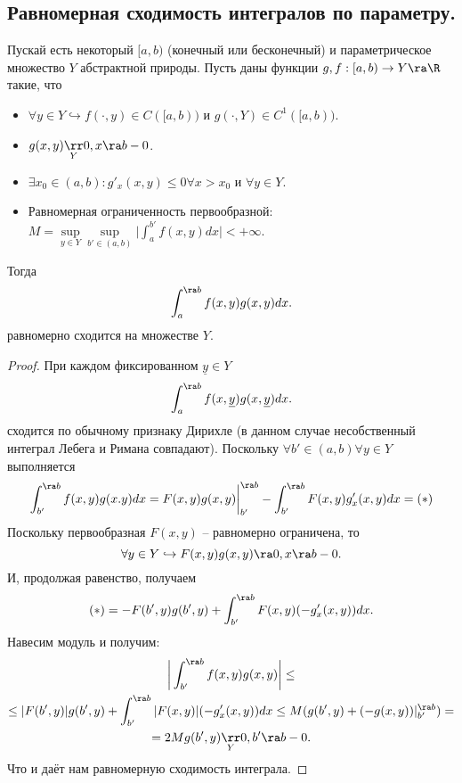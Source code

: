 \subsection{Равномерная сходимость интегралов по параметру.}
\begin{theorem}
    Пускай есть некоторый $[a, b)$ (конечный или бесконечный) и параметрическое множество $Y$ абстрактной природы.
    Пусть даны функции $g, f: [a, b) \to Y \ra \R$ такие, что
    \begin{itemize}
        \item $\forall y \in Y \hookrightarrow f(\cdot, y) \in C([a, b))$ и $g(\cdot, Y) \in C^1([a, b))$.
        \item $g(x, y) \underset{Y}{\rr} 0, x \ra b - 0$.
        \item $\exists x_0 \in (a, b): g'_x(x, y) \leq 0 \forall x > x_0$ и $\forall y \in Y$.
        \item Равномерная ограниченность первообразной: $M = \sup\limits_{y \in Y} \sup\limits_{b' \in (a, b)} \biggr|\int_a^{b'}f(x, y)dx\biggr| < +\infty$.
    \end{itemize}
    Тогда \[
              \int_a^{\ra b} f(x, y)g(x, y)dx.
    \]
    равномерно сходится на множестве $Y$.
\end{theorem}
\begin{proof}
    При каждом фиксированном $\underline{y} \in Y$
    \[
        \int_a^{\ra b}f(x, \underline{y})g(x, \underline{y})dx.
    \]
    сходится по обычному признаку Дирихле (в данном случае несобственный интеграл Лебега и Римана совпадают).
    Поскольку $\forall b' \in (a, b) \forall y \in Y$ выполняется
    \[
        \int_{b'}^{\ra b} f(x, y)g(x. y)dx = F(x, y)g(x, y)\biggr|_{b'}^{\ra b} - \int_{b'}^{\ra b}F(x, y)g'_x(x, y)dx = (*)
    \]
    Поскольку первообразная $F(x, y)$ -- равномерно ограничена, то
    \[
        \forall y \in Y \hookrightarrow F(x, y)g(x, y) \ra 0, x \ra b - 0.
    \]
    И, продолжая равенство, получаем
    \[
        (*) = -F(b', y)g(b', y) + \int_{b'}^{\ra b} F(x, y)(-g'_x(x, y))dx.
    \]
    Навесим модуль и получим:
    \begin{multline*}
        \biggr|\int_{b'}^{\ra b} f(x, y)g(x, y) \biggr| \leq \\ \leq
        |F(b', y)|g(b', y) + \int_{b'}^{\ra b}  |F(x, y)|(-g'_x(x, y))dx \leq M(g(b', y) + (-g(x, y))|^{\ra b}_{b'}) = \\ = 2M g(b', y) \underset{Y}{\rr} 0, b' \ra b - 0.
    \end{multline*}
    Что и даёт нам равномерную сходимость интеграла.
\end{proof}
